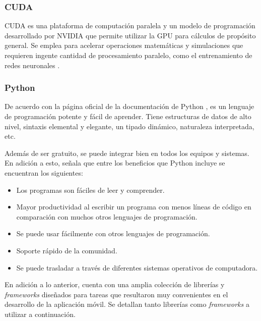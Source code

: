 \subsubsection{CUDA}

CUDA es una plataforma de computación paralela y un modelo de programación desarrollado por NVIDIA que permite utilizar la GPU para cálculos de propósito general. Se emplea para acelerar operaciones matemáticas y simulaciones que requieren ingente cantidad de procesamiento paralelo, como el entrenamiento de redes neuronales \cite{cuda}.

\subsubsection{Python}

De acuerdo con la página oficial de la documentación de Python \cite{pythonTutorial}, es un lenguaje de programación potente y fácil de aprender. Tiene estructuras de datos de alto nivel, sintaxis elemental y elegante, un tipado dinámico, naturaleza interpretada, etc. 

Además de ser gratuito, se puede integrar bien en todos los equipos y sistemas. En adición a esto, \cite{awsPython} señala que entre los beneficios que Python incluye se encuentran los siguientes:

\begin{itemize}
	
	\item Los programas son fáciles de leer y comprender.
	
	\item Mayor productividad al escribir un programa con menos líneas de código en comparación con muchos otros lenguajes de programación.
	
	\item Se puede usar fácilmente con otros lenguajes de programación.
	
	\item Soporte rápido de la comunidad.
	
	\item Se puede trasladar a través de diferentes sistemas operativos de computadora.
	
\end{itemize}

En adición a lo anterior, cuenta con una amplia colección de librerías y \textit{frameworks} diseñados para tareas que resultaron muy convenientes en el desarrollo de la aplicación móvil. Se detallan tanto librerías como \textit{frameworks} a utilizar a continuación.

